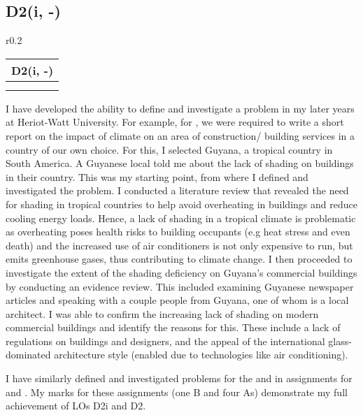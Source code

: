 \subsection*{D2(i, -)}

\begin{wraptable}{r}{0.2\textwidth}
	\begin{tabular}{|ll|}
		\hline
		\multicolumn{2}{|c|}{\cellcolor[HTML]{F8A102}\textbf{D2(i, -) \master}} \\ \hline
		\DI & \DST \\
		\LAB & \CCSA \\ \hline
	\end{tabular}
\end{wraptable}

I have developed the ability to define and investigate a problem in my later years at Heriot-Watt University.
For example, for \DITitle, we were required to write a short report on the impact of climate on an area of construction/ building services in a country of our own choice.
For this, I selected Guyana, a tropical country in South America.
A Guyanese local told me about the lack of shading on buildings in their country.
This was my starting point, from where I defined and investigated the problem.
I conducted a literature review that revealed the need for shading in tropical countries to help avoid overheating in buildings and reduce cooling energy loads.
Hence, a lack of shading in a tropical climate is problematic as overheating poses health risks to building occupants (e.g  heat stress and even death) and the increased use of air conditioners is not only expensive to run, but emits greenhouse gases, thus contributing to climate change.
I then proceeded to investigate the extent of the shading deficiency on Guyana's commercial buildings by conducting an evidence review.
This included examining Guyanese newspaper articles and speaking with a couple people from Guyana, one of whom is a local architect.
I was able to confirm the increasing lack of shading on modern commercial buildings and identify the reasons for this.
These include a lack of regulations on buildings and designers, and the appeal of the international glass-dominated architecture style (enabled due to technologies like air conditioning).

I have similarly defined and investigated problems for the \DSTTitle \space and in assignments for \LABTitle \space and \CCSATitle.
My marks for these assignments (one B and four As) demonstrate my full achievement of LOs D2i and D2.








